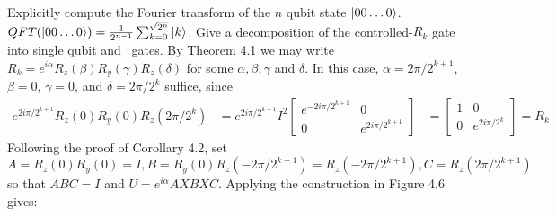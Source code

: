  Explicitly compute the Fourier transform of the $n$ qubit state $\ket{00\ldots0}$.
\Soln $QFT(\ket{00\ldots0})=\frac{1}{2^{n-1}}\sum_{k=0}^{\sqrt{2^n}}\ket{k}$.
 Give a decomposition of the controlled-$R_k$ gate into single qubit and \CNOT\ gates.
\Soln By Theorem 4.1 we may write $R_k=e^{i\alpha}R_z(\beta)R_y(\gamma)R_z(\delta)$ for some $\alpha, \beta, \gamma$ and $\delta$.  In this case, $\alpha=2\pi/2^{k+1}$, $\beta=0$, $\gamma=0$, and $\delta=2\pi/2^k$ suffice, since 
\begin{align*}
e^{2i\pi/2^{k+1}}R_z(0)R_y(0)R_z(2\pi/2^k)&=e^{2i\pi/2^{k+1}}I^2\begin{bmatrix}e^{-2i\pi/2^{k+1}} & 0 \\ 0 & e^{2i\pi/2^{k+1}}\end{bmatrix}
&=\begin{bmatrix}1 & 0 \\ 0 & e^{2i\pi/2^k}\end{bmatrix}=R_k\
\end{align*}
Following the proof of Corollary 4.2, set $A=R_z(0)R_y(0)=I, B=R_y(0)R_z(-2\pi/2^{k+1})=R_z(-2\pi/2^{k+1}),  C=R_z(2\pi/2^{k+1})$ so that $ABC=I$ and $U=e^{i\alpha}AXBXC$.  Applying the construction in Figure 4.6 gives:
